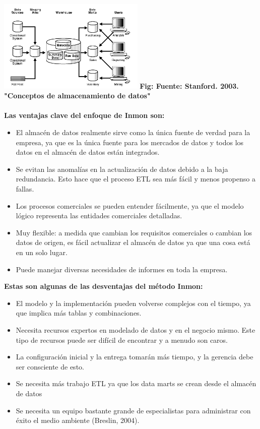 \documentclass[twoside,twocolumn]{article}
\begin{document}
\begin{enumerate}
\includegraphics[width=7cm]{Imagenes/1.PNG}
\textbf{ {\small  Fig: Fuente: Stanford. 2003. "Conceptos de almacenamiento de datos"}}
\\ \\



\textbf{Las ventajas clave del enfoque de Inmon son:}
\\
\begin{itemize}
\item El almacén de datos realmente sirve como la única fuente de verdad para la empresa, ya que es la única fuente para los mercados de datos y todos los datos en el almacén de datos están integrados.
\item Se evitan las anomalías en la actualización de datos debido a la baja redundancia. Esto hace que el proceso ETL sea más fácil y menos propenso a fallas.
\item Los procesos comerciales se pueden entender fácilmente, ya que el modelo lógico representa las entidades comerciales detalladas.
\item Muy flexible: a medida que cambian los requisitos comerciales o cambian los datos de origen, es fácil actualizar el almacén de datos ya que una cosa está en un solo lugar.
\item Puede manejar diversas necesidades de informes en toda la empresa.
\end{itemize}

\textbf{Estas son algunas de las desventajas del método Inmon:}
\begin{itemize}
\item El modelo y la implementación pueden volverse complejos con el tiempo, ya que implica más tablas y combinaciones.
\item Necesita recursos expertos en modelado de datos y en el negocio mismo. Este tipo de recursos puede ser difícil de encontrar y a menudo son caros.
\item La configuración inicial y la entrega tomarán más tiempo, y la gerencia debe ser consciente de esto.
\item Se necesita más trabajo ETL ya que los data marts se crean desde el almacén de datos
\item Se necesita un equipo bastante grande de especialistas para administrar con éxito el medio ambiente (Breslin, 2004).
\end{itemize}



\end{enumerate}
\end{document}
